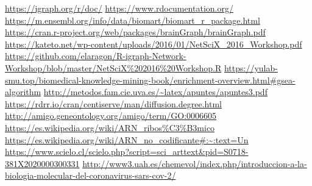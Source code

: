 \url{https://igraph.org/r/doc/}
\url{https://www.rdocumentation.org/}
\url{https://m.ensembl.org/info/data/biomart/biomart_r_package.html}
\url{https://cran.r-project.org/web/packages/brainGraph/brainGraph.pdf}
\url{https://kateto.net/wp-content/uploads/2016/01/NetSciX_2016_Workshop.pdf}
\url{https://github.com/elaragon/R-igraph-Network-Workshop/blob/master/NetSciX%202016%20Workshop.R}
\url{https://yulab-smu.top/biomedical-knowledge-mining-book/enrichment-overview.html#gsea-algorithm}
\url{http://metodos.fam.cie.uva.es/~latex/apuntes/apuntes3.pdf}
\url{https://rdrr.io/cran/centiserve/man/diffusion.degree.html}
\url{http://amigo.geneontology.org/amigo/term/GO:0006605}
\url{https://es.wikipedia.org/wiki/ARN_ribos%C3%B3mico}
\url{https://es.wikipedia.org/wiki/ARN_no_codificante#:~:text=Un}
\url{https://www.scielo.cl/scielo.php?script=sci_arttext&pid=S0718-381X2020000300331}
\url{http://www3.uah.es/chemevol/index.php/introduccion-a-la-biologia-molecular-del-coronavirus-sars-cov-2/}
